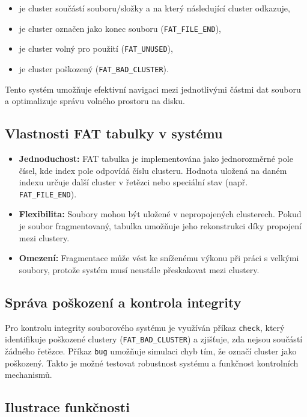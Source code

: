 \documentclass[12pt, a4paper]{article}
\begin{document}
\begin{itemize}
    \item je cluster součástí souboru/složky a na který následující cluster odkazuje,
    \item je cluster označen jako konec souboru (\texttt{FAT\_FILE\_END}),
    \item je cluster volný pro použití (\texttt{FAT\_UNUSED}),
    \item je cluster poškozený (\texttt{FAT\_BAD\_CLUSTER}).
\end{itemize}

Tento systém umožňuje efektivní navigaci mezi jednotlivými částmi dat souboru a optimalizuje správu volného prostoru na disku.

\subsection{Vlastnosti FAT tabulky v systému}

\begin{itemize}
    \item \textbf{Jednoduchost:} FAT tabulka je implementována jako jednorozměrné pole čísel, kde index pole odpovídá číslu clusteru. Hodnota uložená na daném indexu určuje další cluster v řetězci nebo speciální stav (např. \texttt{FAT\_FILE\_END}).
    \item \textbf{Flexibilita:} Soubory mohou být uložené v nepropojených clusterech. Pokud je soubor fragmentovaný, tabulka umožňuje jeho rekonstrukci díky propojení mezi clustery.
    \item \textbf{Omezení:} Fragmentace může vést ke sníženému výkonu při práci s velkými soubory, protože systém musí neustále přeskakovat mezi clustery.
\end{itemize}

\subsection{Správa poškození a kontrola integrity}

Pro kontrolu integrity souborového systému je využíván příkaz \texttt{check}, který identifikuje poškozené clustery (\texttt{FAT\_BAD\_CLUSTER}) a zjišťuje, zda nejsou součástí žádného řetězce. Příkaz \texttt{bug} umožňuje simulaci chyb tím, že označí cluster jako poškozený. Takto je možné testovat robustnost systému a funkčnost kontrolních mechanismů.

\subsection{Ilustrace funkčnosti}
\end{document}
